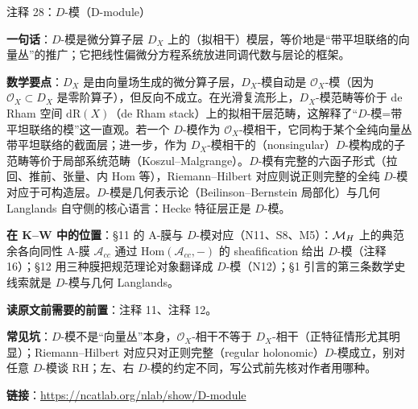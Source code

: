 \begin{kcard}{注释 28：$D$-模（D-module）}

\textbf{一句话}：$D$-模是微分算子层 $D_X$ 上的（拟相干）模层，等价地是“带平坦联络的向量丛”的推广；它把线性偏微分方程系统放进同调代数与层论的框架。

\textbf{数学要点}：$D_X$ 是由向量场生成的微分算子层，$D_X$-模自动是 $\mathcal O_X$-模（因为 $\mathcal O_X\subset D_X$ 是零阶算子），但反向不成立。在光滑复流形上，$D_X$-模范畴等价于 de Rham 空间 $\mathrm{dR}(X)$（de Rham stack）上的拟相干层范畴，这解释了“$D$-模=带平坦联络的模”这一直观。若一个 $D$-模作为 $\mathcal O_X$-模相干，它同构于某个全纯向量丛带平坦联络的截面层；进一步，作为 $D_X$-模相干的（nonsingular）$D$-模构成的子范畴等价于局部系统范畴（Koszul--Malgrange）。$D$-模有完整的六函子形式（拉回、推前、张量、内 Hom 等），Riemann--Hilbert 对应则说正则完整的全纯 $D$-模对应于可构造层。$D$-模是几何表示论（Beilinson--Bernstein 局部化）与几何 Langlands 自守侧的核心语言：Hecke 特征层正是 $D$-模。

\textbf{在 K--W 中的位置}：§11 的 A-膜与 $D$-模对应（N11、S8、M5）：$\mathcal{M}_H$ 上的典范余各向同性 A-膜 $\mathcal A_{cc}$ 通过 $\mathrm{Hom}(\mathcal A_{cc},-)$ 的 sheafification 给出 $D$-模（注释 16）；§12 用三种膜把规范理论对象翻译成 $D$-模（N12）；§1 引言的第三条数学史线索就是 $D$-模与几何 Langlands。

\textbf{读原文前需要的前置}：注释 11、注释 12。

\textbf{常见坑}：$D$-模不是“向量丛”本身，$\mathcal O_X$-相干不等于 $D_X$-相干（正特征情形尤其明显）；Riemann--Hilbert 对应只对正则完整（regular holonomic）$D$-模成立，别对任意 $D$-模谈 RH；左、右 $D$-模的约定不同，写公式前先核对作者用哪种。

\noindent\textbf{链接}：\url{https://ncatlab.org/nlab/show/D-module}
\end{kcard}

